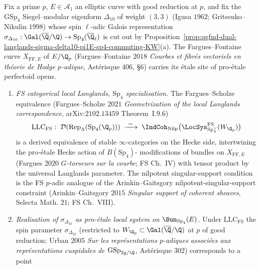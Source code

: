 \begin{conjecture}
\label{conj:qgfnd-fargues-scholze-sigma-delta10-proetale-local-system-BunSp4}
Fix a prime $p$, $E \in \mathcal A_1$ an elliptic curve with good
reduction at $p$, and fix the $\mathrm{GSp}_4$ Siegel--modular
eigenform $\Delta_{10}$ of weight $(3,3)$ (Igusa $1962$;
Gritsenko--Nikulin $1998$) whose spin $\ell$-adic Galois
representation $\sigma_{\Delta_{10}} : \Gal(\overline{\Q}/\Q) \to
\mathrm{Sp}_4(\overline\Q_\ell)$ is cut out by
Proposition~\ref{prop:qgfnd-dual-langlands-sigma-delta10-pi1E-sp4-commuting-KW}(a).
The Fargues--Fontaine curve $X_{\mathrm{FF},E}$ of $E/\Q_p$ (Fargues--Fontaine
$2018$ \emph{Courbes et fibr\'es vectoriels en th\'eorie de Hodge
$p$-adique}, Ast\'erisque $406$, \S$6$) carries its \'etale site of
pro-\'etale perfectoid opens.
\begin{enumerate}
 \item[\textup{(a)}] \emph{FS categorical local Langlands, $\mathrm{Sp}_4$
 specialisation.} The Fargues--Scholze equivalence (Fargues--Scholze
 $2021$ \emph{Geometrization of the local Langlands correspondence},
 arXiv:$2102.13459$ Theorem~I.$9.6$)
 \[
 \mathrm{LLC}_{\mathrm{FS}}:\;
 \mathcal D(\mathrm{Rep}_{\Lambda}(\mathrm{Sp}_4(\Q_p)))
 \;\xrightarrow{\ \sim\ }\;
 \IndCoh_{\mathrm{Nilp}}\bigl(\LocSys_{\mathrm{Sp}_4^\vee}^{\mathrm{FS}}(W_{\Q_p})\bigr)
 \]
 is a derived equivalence of stable $\infty$-categories on the
 Hecke side, intertwining the pro-\'etale Hecke action of $B(\mathrm{Sp}_4)$-
 modifications of bundles on $X_{\mathrm{FF},E}$ (Fargues $2020$ \emph{$G$-torseurs
 sur la courbe}; FS Ch.~IV) with tensor product by the universal
 Langlands parameter. The nilpotent singular-support condition is
 the FS $p$-adic analogue of the Arinkin--Gaitsgory
 nilpotent-singular-support constraint (Arinkin--Gaitsgory
 $2015$ \emph{Singular support of coherent sheaves}, Selecta Math.
 $21$; FS Ch.~VIII).
 \item[\textup{(b)}] \emph{Realisation of $\sigma_{\Delta_{10}}$ as
 pro-\'etale local system on $\Bun_{\mathrm{Sp}_4}(E)$.} Under
 $\mathrm{LLC}_{\mathrm{FS}}$ the spin parameter $\sigma_{\Delta_{10}}$
 (restricted to $W_{\Q_p}\subset\Gal(\overline\Q/\Q)$ at $p$ of good
 reduction; Urban $2005$ \emph{Sur les repr\'esentations $p$-adiques
 associ\'ees aux repr\'esentations cuspidales de $\mathrm{GSp}_{2g/\Q}$},
 Ast\'erisque $302$) corresponds to a point

\end{enumerate}
\end{conjecture}
